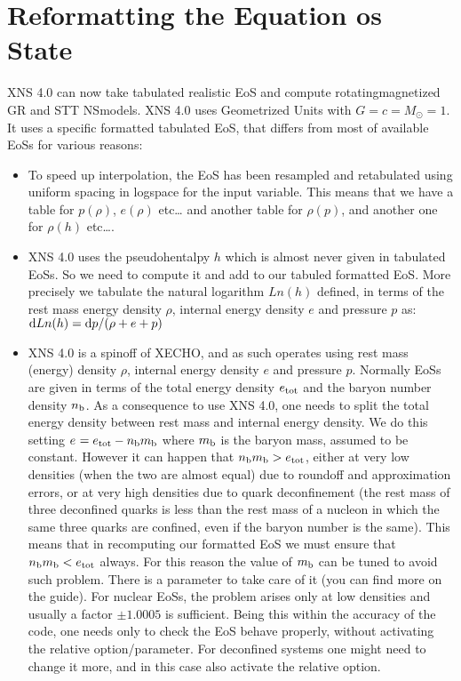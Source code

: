 \documentclass[letterpaper,10pt,english]{sphinxmanual}
\begin{document}
\chapter{Reformatting the Equation os State}
\label{\detokenize{eos:reformatting-the-equation-os-state}}\label{\detokenize{eos::doc}}
\sphinxAtStartPar
XNS 4.0 can now take tabulated realistic EoS and compute rotating\sphinxhyphen{}magnetized GR and STT NS\sphinxhyphen{}models. XNS 4.0 uses Geometrized Units with \(G=c=M_\odot=1\). It uses a specific formatted tabulated EoS, that differs from most of available EoSs for various reasons:
\begin{itemize}
\item {} 
\sphinxAtStartPar
To speed up interpolation, the EoS has been resampled and re\sphinxhyphen{}tabulated using uniform spacing in log\sphinxhyphen{}space for the input variable. This means that we have a table for \(p(\rho)\), \(e(\rho)\) etc…  and another table for \(\rho(p)\), and another one for \(\rho(h)\) etc….

\item {} 
\sphinxAtStartPar
XNS 4.0 uses the pseudo\sphinxhyphen{}hentalpy \(h\) which is almost never given in tabulated EoSs. So we need to compute it and add to our tabuled formatted EoS. More precisely we tabulate the natural logarithm \(Ln(h)\) defined, in terms of the rest mass energy density \(\rho\), internal energy density \(e\) and pressure \(p\) as: \({\rm d} Ln(h) = {\rm d}p/(\rho +e +p)\)

\item {} 
\sphinxAtStartPar
XNS 4.0  is a spin\sphinxhyphen{}off of X\sphinxhyphen{}ECHO, and as such operates using rest mass (energy) density \(\rho\), internal energy density \(e\) and pressure \(p\). Normally EoSs are given in terms of the total energy density \(e_{\rm tot}\) and the baryon number density \(n_{\rm b}\). As a consequence to use XNS 4.0, one needs to split the total energy density between rest mass and internal energy density. We do this setting \(e_{\rm} = e_{\rm tot}- n_{\rm b} m_{\rm b} \) where \(m_{\rm b}\) is the baryon mass, assumed to be constant. However it can happen that \(n_{\rm b} m_{\rm b} > e_{\rm tot}\), either at very low densities (when the two are almost equal) due to round\sphinxhyphen{}off and approximation errors, or at very high densities due to quark deconfinement (the rest mass of three deconfined quarks is less than the rest mass of a nucleon in which the same three quarks are confined, even if the baryon number is the same).  This means that in recomputing our formatted EoS we must ensure that \(n_{\rm b} m_{\rm b} < e_{\rm tot}\) always. For this reason the value of \(m_{\rm b}\) can be tuned to avoid such problem. There is a parameter  to take care of it (you can find more on the guide). For nuclear EoSs, the problem arises only at low densities and usually a factor \(\pm 1.0005\) is sufficient. Being this within the accuracy of the code,  one needs only to check the EoS behave properly, without activating the relative option/parameter.  For deconfined systems one might need to change it more, and in this case also activate the relative option.

\end{itemize}
\end{document}
